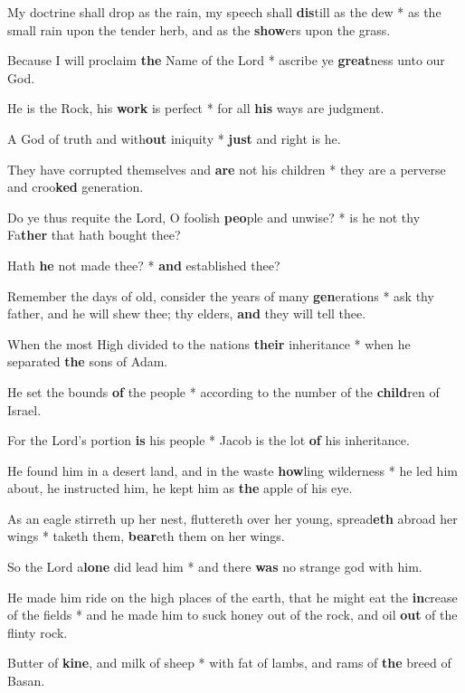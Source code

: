 \begin{multicols}{2}
	My doctrine shall drop as the rain, my speech shall \textbf{dis}till as the dew * as the small rain upon the tender herb, and as the \textbf{show}ers upon the grass.
	
	Because I will proclaim \textbf{the} Name of the Lord * ascribe ye \textbf{great}ness unto our God.
	
	He is the Rock, his \textbf{work} is perfect * for all \textbf{his} ways are judgment.
	
	A God of truth and with\textbf{out} iniquity * \textbf{just} and right is he.
	
	They have corrupted themselves and \textbf{are} not his children * they are a perverse and croo\textbf{ked} generation.
	
	Do ye thus requite the Lord, O foolish \textbf{peo}ple and unwise? * is he not thy Fa\textbf{ther} that hath bought thee?
	
	Hath \textbf{he} not made thee? * \textbf{and} established thee?
	
	Remember the days of old, consider the years of many \textbf{gen}erations * ask thy father, and he will shew thee; thy elders, \textbf{and} they will tell thee.
	
	When the most High divided to the nations \textbf{their} inheritance * when he separated \textbf{the} sons of Adam.
	
	He set the bounds \textbf{of} the people * according to the number of the \textbf{child}ren of Israel.
	
	For the Lord's portion \textbf{is} his people * Jacob is the lot \textbf{of} his inheritance.
	
	He found him in a desert land, and in the waste \textbf{how}ling wilderness * he led him about, he instructed him, he kept him as \textbf{the} apple of his eye.
	
	As an eagle stirreth up her nest, fluttereth over her young, spread\textbf{eth} abroad her wings * taketh them, \textbf{bear}eth them on her wings.
	
	So the Lord a\textbf{lone} did lead him * and there \textbf{was} no strange god with him.
	
	He made him ride on the high places of the earth, that he might eat the \textbf{in}crease of the fields * and he made him to suck honey out of the rock, and oil \textbf{out} of the flinty rock.
	
	Butter of \textbf{kine}, and milk of sheep * with fat of lambs, and rams of \textbf{the} breed of Basan.
	

\end{multicols}
